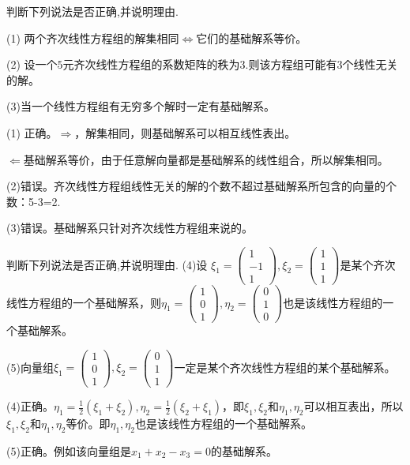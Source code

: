 \documentclass[a4paper]{report}
\begin{document}
\EX 判断下列说法是否正确,并说明理由.

(1) 两个齐次线性方程组的解集相同$\Leftrightarrow$它们的基础解系等价。

(2) 设一个$5$元齐次线性方程组的系数矩阵的秩为$3$.则该方程组可能有$3$个线性无关的解。

(3)当一个线性方程组有无穷多个解时一定有基础解系。

\begin{jie}
(1) 正确。$\Rightarrow$，解集相同，则基础解系可以相互线性表出。

$\Leftarrow$基础解系等价，由于任意解向量都是基础解系的线性组合，所以解集相同。

(2)错误。齐次线性方程组线性无关的解的个数不超过基础解系所包含的向量的个数：5-3=2.

(3)错误。基础解系只针对齐次线性方程组来说的。
\end{jie}

\EX 判断下列说法是否正确,并说明理由.
(4)设
$
\xi_1=
\begin{pmatrix}
1\\-1 \\1
\end{pmatrix},\xi_2=
\begin{pmatrix}
1\\1 \\1
\end{pmatrix}
$是某个齐次线性方程组的一个基础解系，则$
\eta_1=
\begin{pmatrix}
1\\0 \\1
\end{pmatrix},\eta_2=
\begin{pmatrix}
0\\1 \\0
\end{pmatrix}
$也是该线性方程组的一个基础解系。

(5)向量组$
\xi_1=\begin{pmatrix}
1\\0 \\1
\end{pmatrix},\xi_2=
\begin{pmatrix}
0\\1 \\1
\end{pmatrix}
$一定是某个齐次线性方程组的某个基础解系。

\begin{jie}
(4)正确。$\eta_1=\frac{1}{2}(\xi_1+\xi_2),\eta_2=\frac{1}{2}(\xi_2+\xi_1)$，即$\xi_1,\xi_2$和$\eta_1,\eta_2$可以相互表出，所以$\xi_1,\xi_2$和$\eta_1,\eta_2$等价。即$\eta_1,\eta_2$也是该线性方程组的一个基础解系。

(5)正确。例如该向量组是$x_1+x_2-x_3=0$的基础解系。
\end{jie}
\end{document}
